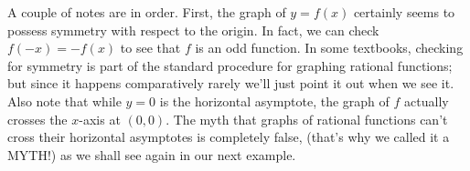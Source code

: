 \medskip

A couple of notes are in order.  First, the graph of $y=f(x)$ certainly seems to possess symmetry with respect to the origin.  In fact, we can check $f(-x) = -f(x)$ to see that $f$ is an odd function.  In some textbooks, checking for symmetry is part of the standard procedure for graphing rational functions; but since it happens comparatively rarely we'll just point it out when we see it.  Also note that while $y=0$ is the horizontal asymptote, the graph of $f$ actually crosses the $x$-axis at $(0,0)$.  The myth that graphs of rational functions can't cross their horizontal asymptotes is completely false, (that's why we called it a MYTH!) as we shall see again in our next example.

\medskip


